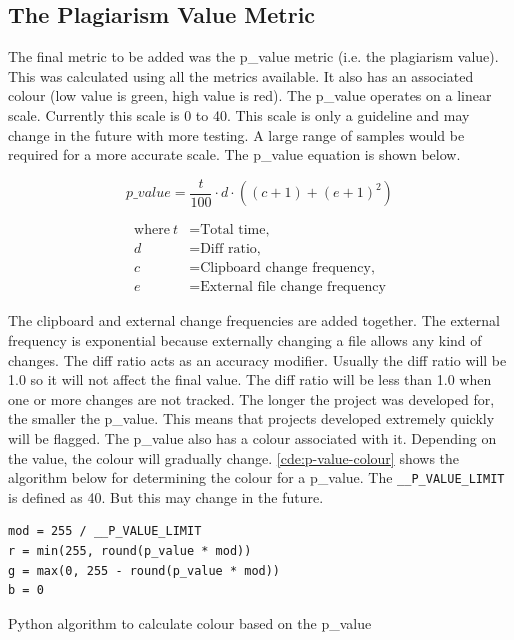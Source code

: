 \subsection{The Plagiarism Value Metric}
\label{sec:the-plagiarism-value-metric}
The final metric to be added was the p\_value metric (i.e. the plagiarism value). This was calculated using all the metrics available. It also has an associated colour (low value is green, high value is red). The p\_value operates on a linear scale. Currently this scale is 0 to 40. This scale is only a guideline and may change in the future with more testing. A large range of samples would be required for a more accurate scale. The p\_value equation is shown below.

\[
  p\_value = \frac{t}{100} \cdot d \cdot ((c + 1) + (e + 1)^2)
\]

\begin{align*}
  \text{where}~t &= \text{Total time,} \\
  d &= \text{Diff ratio,} \\
  c &= \text{Clipboard change frequency,} \\
  e &= \text{External file change frequency}
\end{align*}

The clipboard and external change frequencies are added together. The external frequency is exponential because externally changing a file allows any kind of changes. The diff ratio acts as an accuracy modifier. Usually the diff ratio will be 1.0 so it will not affect the final value. The diff ratio will be less than 1.0 when one or more changes are not tracked. The longer the project was developed for, the smaller the p\_value. This means that projects developed extremely quickly will be flagged. The p\_value also has a colour associated with it. Depending on the value, the colour will gradually change. \autoref{cde:p-value-colour} shows the algorithm below for determining the colour for a p\_value. The \texttt{\_\_P\_VALUE\_LIMIT} is defined as 40. But this may change in the future.

\begin{code}
\begin{verbatim}
mod = 255 / __P_VALUE_LIMIT
r = min(255, round(p_value * mod))
g = max(0, 255 - round(p_value * mod))
b = 0
\end{verbatim}
\caption{Python algorithm to calculate colour based on the p\_value}
\label{cde:p-value-colour}
\end{code}

